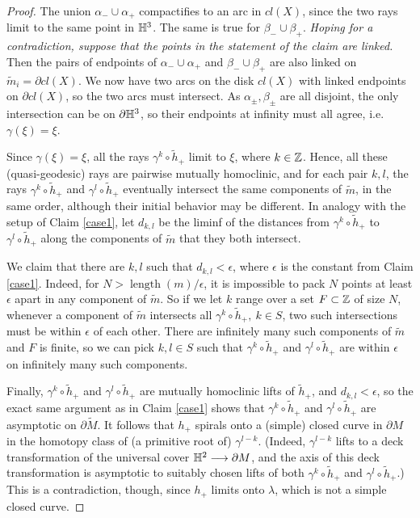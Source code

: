 \documentclass[12pt]{amsart}
\theoremstyle{definition}
\theoremstyle{remark}
\DeclareMathOperator{\length}{length}
\begin{document}
\begin {proof}
The union $\alpha_-\cup \alpha_+$  compactifies to an arc in $cl(X)$, since the two rays limit to the same point in $\mathbb H^3$. The same is true for $\beta_-\cup \beta_+$. \emph{Hoping for a contradiction, suppose that the points in the statement of the claim are linked.} Then the pairs of endpoints of $\alpha_- \cup \alpha_+$ and $\beta_- \cup \beta_+$ are also linked on $\tilde m_i = \partial cl(X)$. We now have two arcs on the disk $cl(X)$ with linked endpoints on $\partial cl(X)$, so the two arcs must intersect. As $\alpha_\pm,\beta_\pm$ are all disjoint, the only intersection can be on $\partial \mathbb H^3$, so their endpoints at infinity must all agree, i.e.\ $\gamma(\xi)=\xi$.

 Since $\gamma(\xi)=\xi$, all the rays $ \gamma^k \circ \tilde h_+$ limit to $\xi$, where $k\in \mathbb Z$. Hence, all these (quasi-geodesic) rays are pairwise mutually homoclinic, and for each pair $k,l$, the rays $ \gamma^k \circ \tilde h_+$ and $ \gamma^l \circ \tilde h_+$ eventually intersect the same components of $\tilde m$, in the same order, although their initial behavior may be different.  In analogy with the setup of Claim \ref{case1}, let $d_{k,l}$ be the liminf of the distances from $\gamma^k \circ \tilde h_+$ to $\gamma^l \circ \tilde h_+$ along the components of $\tilde m$ that they both intersect. 

We claim that there are $k,l$  such that $d_{k,l} < \epsilon$, where $\epsilon$ is the constant from Claim \ref{case1}. Indeed, for $N> \length(m)/\epsilon$, it is impossible to pack $N$ points at least $\epsilon$ apart in any component of $\tilde m$. So if we let $k$ range over a set $F \subset \mathbb Z$ of size $N$, whenever a component of $\tilde m$ intersects all $\gamma^k \circ \tilde h_+, \ k\in S$, two such intersections must be within $\epsilon$ of each other. There are infinitely many such components of $\tilde m$ and $F$ is finite, so we can pick $k,l \in S$ such that $\gamma^k \circ \tilde h_+$ and $\gamma^l \circ \tilde h_+$ are within $\epsilon$ on infinitely many such components.


Finally, $ \gamma^k \circ \tilde h_+$ and $ \gamma^l \circ \tilde h_+$ are mutually homoclinic lifts of $\tilde h_+$, and $d_{k,l} < \epsilon$, so the exact same argument as in Claim \ref{case1}  shows that $ \gamma^k \circ \tilde h_+$ and $ \gamma^l \circ \tilde h_+$ are asymptotic on $\partial \tilde M$. It follows that $ h_+$ spirals onto a (simple) closed curve in $\partial M$ in the homotopy class of (a primitive root of) $\gamma^{l-k}$. (Indeed, $\gamma^{l-k}$ lifts to a deck transformation of the universal cover $\mathbb H^2 \longrightarrow \partial M$, and the axis of this deck transformation is asymptotic to suitably chosen lifts of both $ \gamma^k \circ \tilde h_+$ and $ \gamma^l \circ \tilde h_+$.) This is a contradiction, though, since  $ h_+$ limits onto $\lambda$, which is not a simple closed curve.
\end {proof}
\end{document}
